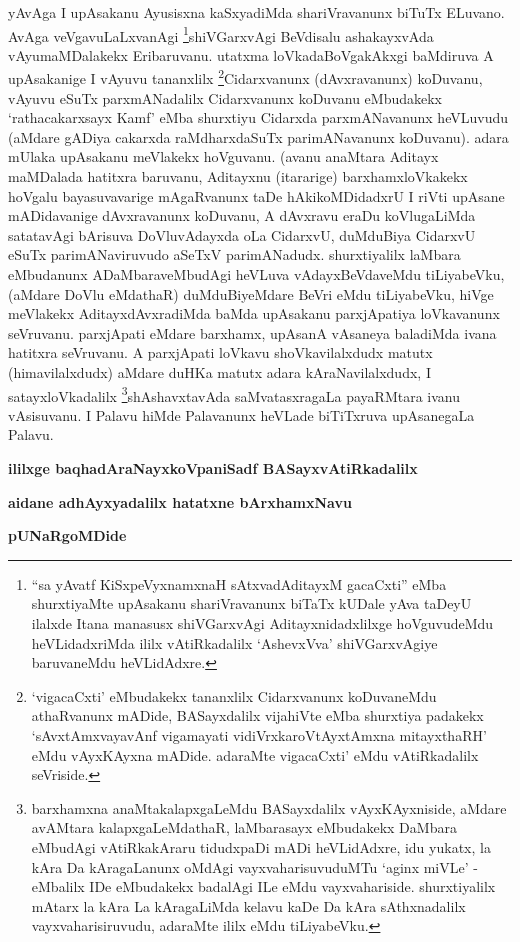 \begin{artha}
yAvAga I upAsakanu Ayusisxna kaSxyadiMda shariVravanunx biTuTx ELuvano. AvAga veVgavuLaLxvanAgi \footnote{``sa yAvatf KiSxpeVyxnamxnaH sAtxvadAditayxM gacaCxti'' eMba shurxtiyaMte upAsakanu shariVravanunx biTaTx kUDale yAva taDeyU ilalxde Itana manasusx shiVGarxvAgi Aditayxnidadxlilxge hoVguvudeMdu heVLidadxriMda ililx vAtiRkadalilx `AshevxVva' shiVGarxvAgiye baruvaneMdu heVLidAdxre.}shiVGarxvAgi BeVdisalu ashakayxvAda vAyumaMDalakekx Eribaruvanu. utatxma loVkada\break BoVgakAkxgi baMdiruva A upAsakanige I vAyuvu tananxlilx \footnote{`vigacaCxti' eMbudakekx tananxlilx Cidarxvanunx koDuvaneMdu athaRvanunx mADide, BASayxdalilx vija{\null}hiVte eMba shurxtiya padakekx `sAvxtAmxvayavAnf vigamayati vidiVrxkaroVtAyxtAmxna mitayxthaRH' eMdu vAyxKAyxna mADide. adaraMte vigacaCxti' eMdu vAtiRkadalilx seVriside.}Cidarxvanunx (dAvxravanunx) koDuvanu, vAyuvu eSuTx parxmANadalilx Cidarxvanunx koDuvanu eMbudakekx `rathacakarxsayx Kamf' eMba shurxtiyu Cidarxda parxmANavanunx heVLuvudu (aMdare gADiya cakarxda raMdharxdaSuTx parimANavanunx koDuvanu). adara mUlaka upAsakanu meVlakekx hoVguvanu. (avanu anaMtara Aditayx maMDalada hatitxra baruvanu, Aditayxnu (itararige) barxhamxloVkakekx hoVgalu bayasuvavarige mAgaRvanunx taDe hAkikoMDidadxrU I riVti upAsane mADidavanige dAvxravanunx koDuvanu, A dAvxravu eraDu koVlugaLiMda satatavAgi bArisuva DoVluvAdayxda oLa CidarxvU, duMduBiya CidarxvU eSuTx parimANaviruvudo aSeTxV parimANadudx. shurxtiyalilx laMbara eMbudanunx ADaMbaraveMbudAgi heVLuva vAdayxBeVdaveMdu tiLiyabeVku, (aMdare DoVlu eMdathaR) duMduBiyeMdare BeVri eMdu tiLiyabeVku, hiVge meVlakekx AditayxdAvxradiMda baMda upAsakanu parxjApatiya loVkavanunx seVruvanu. parxjApati eMdare barxhamx, upAsanA vAsaneya baladiMda ivana hatitxra seVruvanu. A parxjApati loVkavu shoVkavilalxdudx matutx (himavilalxdudx) aMdare duHKa matutx adara kAraNavilalxdudx, I satayxloVkadalilx \footnote{barxhamxna anaMtakalapxgaLeMdu BASayxdalilx vAyxKAyxniside, aMdare avAMtara kalapxgaLeMdathaR, laMbarasayx eMbudakekx DaMbara eMbudAgi vAtiRkakAraru tidudxpaDi mADi heVLidAdxre, idu yukatx, la kAra Da kAragaLanunx oMdAgi vayxvaharisuvuduMTu `aginx miVLe' - eMbalilx IDe eMbudakekx badalAgi ILe eMdu vayxvahariside. shurxtiyalilx mAtarx la kAra La kAragaLiMda kelavu kaDe Da kAra sAthxnadalilx vayxvaharisiruvudu, adaraMte ililx eMdu tiLiyabeVku.}shAshavxtavAda saMvatasxragaLa payaRMtara ivanu vAsisuvanu. I Palavu hiMde Palavanunx heVLade biTiTxruva upAsanegaLa Palavu.
\end{artha}

\begin{center}
{\bf ililxge baqhadAraNayxkoVpaniSadf BASayxvAtiRkadalilx}
\smallskip

{\bf aidane adhAyxyadalilx hatatxne bArxhamxNavu}
\smallskip

{\bf pUNaRgoMDide}
\end{center}

